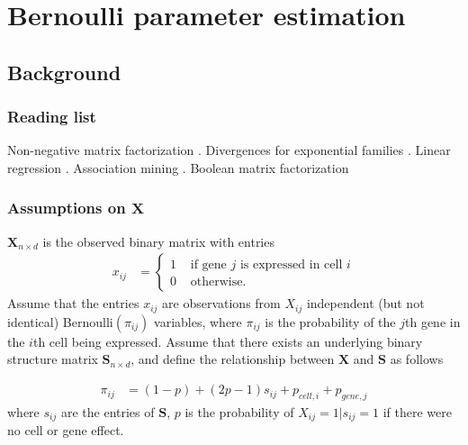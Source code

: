 \documentclass[12pt]{article}
\begin{document}
\newcommand{\comm}[1]{}

\newcommand{\mb}{\mathbf}

\section{Bernoulli parameter estimation} \label{sec:BerParamEst} %

\subsection{Background} 

\subsubsection*{Reading list} %
Non-negative matrix factorization \cite{Lee1999Learning}. 
Divergences for exponential families \cite{Banerjee2005Clustering}.
Linear regression  \cite[ch 12.3]{Casella2002Statistical}.  
Association mining \cite{Agrawal1993Mining}.
Boolean matrix factorization \cite{Miettinen2008Discrete}

\subsubsection*{Assumptions on $\mathbf{X}$} %

$\mathbf{X}_{n \times d}$ is the observed binary matrix with entries
\begin{align}
  x_{ij} &= 
  \begin{cases}
   1 &  \text{ if gene $j$ is expressed in cell $i$} \\
   0 & \text{ otherwise.}
  \end{cases}
\end{align}
Assume that the entries $x_{ij}$ are observations from $X_{ij}$  independent (but not identical) Bernoulli$(\pi_{ij})$ variables, where $\pi_{ij}$ is the probability of the $j$th gene in the $i$th cell being expressed. 
Assume that there exists an underlying binary structure matrix $\mathbf{S}_{n \times d}$, and define the relationship between  $\mathbf{X}$ and  $\mathbf{S}$ as follows

\begin{align} \label{eg: Xassumptions}
   \pi_{ij} &= (1 -  p) + (2  p - 1) s_{ij} + p_{cell, i} + p_{gene,j}
\end{align}
where  $s_{ij}$ are the entries of $\mathbf{S}$, $p$ is the probability of $X_{ij} = 1 | s_{ij} = 1$ if there were no cell or gene effect. 
\end{document}
